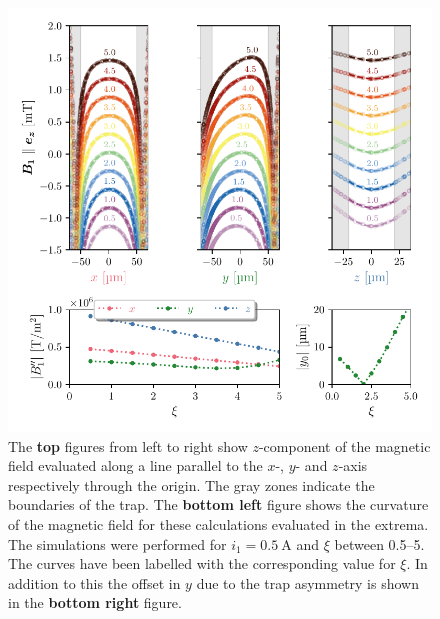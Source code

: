 \begin{figure}
    \centering
    \includegraphics{figures/data/magnetic_field_curvature.pdf}
    \caption{The \textbf{top} figures from left to right show $z$-component of the magnetic field evaluated along a line parallel to the $x$-, $y$- and $z$-axis respectively through the origin. The gray zones indicate the boundaries of the trap. The \textbf{bottom left} figure shows the curvature of the magnetic field for these calculations evaluated in the extrema. The simulations were performed for $i_1=\qty{0.5}{\ampere}$ and $\xi$ between \numrange{0.5}{5}. The curves have been labelled with the corresponding value for $\xi$. In addition to this the offset in $y$ due to the trap asymmetry is shown in the \textbf{bottom right} figure.}
    \label{fig:magnetic-field-curvature}
\end{figure}

